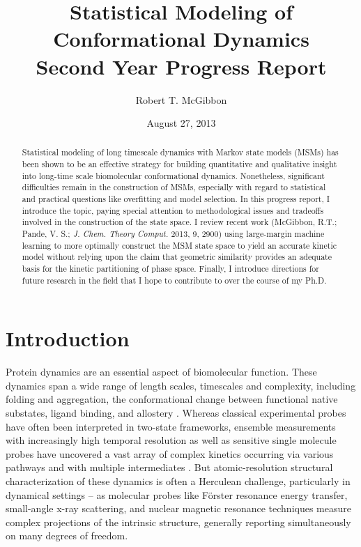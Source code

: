 \documentclass[twocolumn,floatfix,nofootinbib,aps]{revtex4-1}
\begin{document}
\title{Statistical Modeling of Conformational Dynamics \\ {\normalsize Second Year Progress Report}}
\author{Robert T. McGibbon} 
\date{August 27, 2013}

\begin{abstract}
Statistical modeling of long timescale dynamics with Markov state models (MSMs) has been shown to be an effective strategy for building quantitative and qualitative insight into long-time scale biomolecular conformational dynamics. Nonetheless, significant difficulties remain in the construction of MSMs, especially with regard to statistical and practical questions like overfitting and model selection. In this progress report, I introduce the topic, paying special attention to methodological issues and tradeoffs involved in the construction of the state space. I review recent work (McGibbon, R.T.; Pande, V. S.; \emph{J. Chem. Theory Comput.} 2013, 9, 2900) using large-margin machine learning to more optimally construct the MSM state space to yield an accurate kinetic model without relying upon the claim that geometric similarity provides an adequate basis for the kinetic partitioning of phase space. Finally, I introduce directions for future research in the field that I hope to contribute to over the course of my Ph.D.
\end{abstract}

\maketitle

\section{Introduction}
Protein dynamics are an essential aspect of biomolecular function. These dynamics span a wide range of length scales, timescales and complexity, including folding and aggregation, the conformational change between functional native substates, ligand binding, and allostery \cite{Dobson2003Protein, Kim2008Real, Austin1975Dynamics, Bahar2007Intrinsic}. Whereas classical experimental probes have often been interpreted in two-state frameworks, ensemble measurements with increasingly high temporal resolution as well as sensitive single molecule probes have uncovered a vast array of complex kinetics occurring via various pathways and with multiple intermediates \cite{Cosa2006Evidence, Zhang2011Direct}. But atomic-resolution structural characterization of these dynamics is often a Herculean challenge, particularly in dynamical settings -- as molecular probes like F\"{o}rster resonance energy transfer, small-angle x-ray scattering, and nuclear magnetic resonance techniques measure complex projections of the intrinsic structure, generally reporting simultaneously on many degrees of freedom\cite{Mertens2010Structural, Tzeng2011Protein}.
\end{document}
